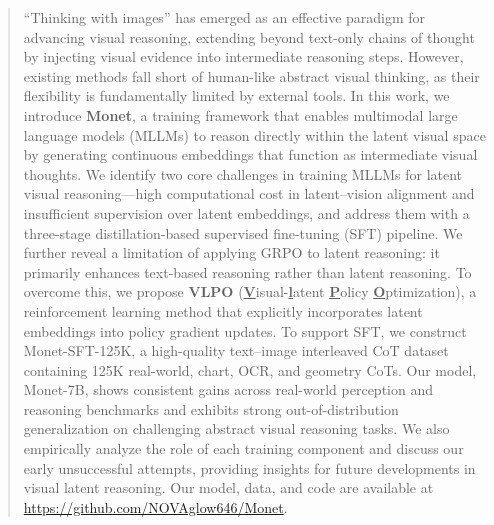 \begin{abstract}
``Thinking with images'' has emerged as an effective paradigm for advancing visual reasoning, extending beyond text-only chains of thought by injecting visual evidence into intermediate reasoning steps. However, existing methods fall short of human-like abstract visual thinking, as their flexibility is fundamentally limited by external tools. In this work, we introduce \textbf{Monet}, a training framework that enables multimodal large language models (MLLMs) to reason directly within the latent visual space by generating continuous embeddings that function as intermediate visual thoughts. We identify two core challenges in training MLLMs for latent visual reasoning—high computational cost in latent–vision alignment and insufficient supervision over latent embeddings, and address them with a three-stage distillation-based supervised fine-tuning (SFT) pipeline. We further reveal a limitation of applying GRPO to latent reasoning: it primarily enhances text-based reasoning rather than latent reasoning. To overcome this, we propose \textbf{VLPO} (\underline{\textbf{V}}isual-\underline{\textbf{l}}atent \underline{\textbf{P}}olicy \underline{\textbf{O}}ptimization), a reinforcement learning method that explicitly incorporates latent embeddings into policy gradient updates.
To support SFT, we construct Monet-SFT-125K, a high-quality text–image interleaved CoT dataset containing 125K real-world, chart, OCR, and geometry CoTs. Our model, Monet-7B, shows consistent gains across real-world perception and reasoning benchmarks and exhibits strong out-of-distribution generalization on challenging abstract visual reasoning tasks. We also empirically analyze the role of each training component and discuss our early unsuccessful attempts, providing insights for future developments in visual latent reasoning. Our model, data, and code are available at \url{https://github.com/NOVAglow646/Monet}.

\end{abstract}